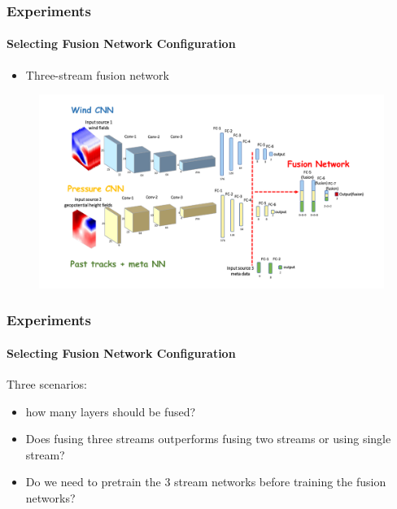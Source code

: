 \documentclass{beamer}
\begin{document}
\begin{frame}
\frametitle{Experiments}
\framesubtitle{Selecting Fusion Network Configuration}
\begin{itemize}
	\item  Three-stream fusion network \\
\end{itemize}
\begin{figure}
	\includegraphics[width=1.0\linewidth]{figs/fusion_network.pdf}
\end{figure}
\end{frame}

\begin{frame}
\frametitle{Experiments}
\framesubtitle{Selecting Fusion Network Configuration}
Three scenarios:
\begin{itemize}
	\item  how many layers should be fused?
	\item  Does fusing three streams outperforms fusing two streams or using single stream?
	\item  Do we need to pretrain the 3 stream  networks before training the fusion networks?
\end{itemize}
\end{frame}
\end{document}
